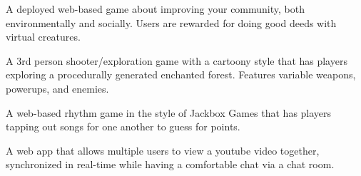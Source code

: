 \documentclass[10pt,a4paper,ragged2e,withhyper]{altacv}
\begin{document}
\begin{paracol}{2}
\divider{}

\small{}A deployed web-based game about improving your community, both environmentally and socially.
Users are rewarded for doing good deeds with virtual creatures.

\divider{}

\small{}A 3rd person shooter/exploration game with a cartoony style that has players exploring a procedurally generated enchanted forest.
Features variable weapons, powerups, and enemies.

\divider{}

\small{}A web-based rhythm game in the style of Jackbox Games that has players tapping out songs for one another to guess for points.

\divider{}

\small{}A web app that allows multiple users to view a youtube video together, synchronized in real-time while having a comfortable chat via a chat room.

\divider{}

\medskip




\switchcolumn{}

\divider{}

\divider{}

\divider{}

\divider{}

\divider{}

\divider{}

\divider{}

\divider{}



\divider{}

\divider{}


\end{paracol}
\end{document}
